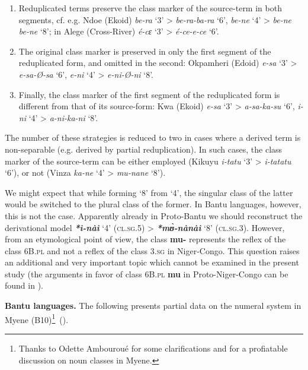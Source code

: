 \begin{enumerate}
\item Reduplicated terms preserve the class marker of the source-term in both segments, cf. e.g. Ndoe (Ekoid) \textit{be-ra} ‘3’ > \textit{be-ra-ba-ra} ‘6’, \textit{be-ne} ‘4’ > \textit{be-ne} \textit{be-ne} ‘8’; in Alege (Cross-River) \textit{{\'{e}}-cɛ} ‘3’ > \textit{{\'{e}}-ce-e-ce} `6'.
\item The original class marker is preserved in only the first segment of the reduplicated form, and omitted in the second: Okpamheri (Edoid) \textit{e-sa} ‘3’ > \textit{e-sa-Ø-sa} ‘6’, \textit{e-ni} ‘4’ > \textit{e-ni-Ø-ni} ‘8’.
\item Finally, the class marker of the first segment of the reduplicated form is different from that of its source-form: Kwa (Ekoid) \textit{e-sa} ‘3’ > \textit{a-sa-ka-su} ‘6’, \textit{i-ni} ‘4’ > \textit{a-ni-ka-ni} ‘8’.
\end{enumerate}
The number of these strategies is reduced to two in cases where a derived term is non-separable (e.g. derived by partial reduplication). In such cases, the class marker of the source-term can be either employed (Kikuyu \textit{i-tatu} ‘3’  >  \textit{i-tatatu} ‘6’), or not (Vinza \textit{ka-}\textit{ne} ‘4’ > \textit{mu-}\textit{nane} ‘8’). 

We might expect that while forming ‘8’ from ‘4’, the singular class of the latter would be switched to the plural class of the former. In Bantu languages, however, this is not the case. Apparently already in Proto-Bantu we should reconstruct the derivational model  \textbf{\textit{*ì-n{\`{a}}ì}} ‘4’ (\textsc{cl}.\textsc{sg}.5) > \textbf{\textit{*m{\`{ʊ}}-n{\`{a}}n{\`{a}}ì}} ‘8’ (\textsc{cl}.\textsc{sg}.3). However, from an etymological point of view, the class \textbf{mu-} represents the reflex of the class 6B.\textsc{pl} and not a reflex of the class 3.\textsc{sg} in Niger-Congo. This question raises an additional and very important topic which cannot be examined in the present study (the arguments in favor of class 6B.\textsc{pl}  \textbf{mu} in Proto-Niger-Congo can be found in \citealt{Pozdniakov2013}). 

\textbf{Bantu languages.} The following presents partial data on the numeral system in Myene (B10)\footnote{Thanks to Odette Ambouroué for some clarifications and for a profiatable discussion on noun classes in Myene.}~().



